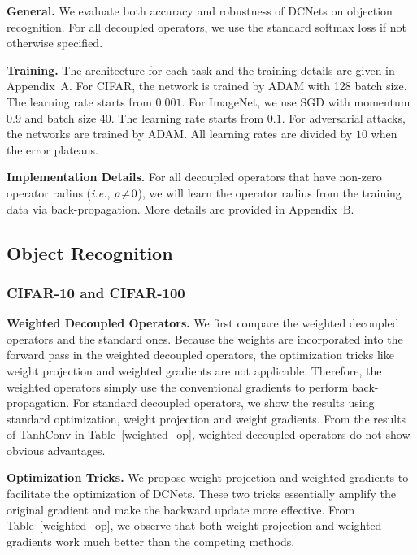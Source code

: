 \textbf{General.} We evaluate both accuracy and robustness of DCNets on objection recognition. For all decoupled operators, we use the standard softmax loss if not otherwise specified.
\par
\textbf{Training.} The architecture for each task and the training details are given in Appendix~\textcolor[rgb]{0.7551,0.2333,0.3333}{A}. For CIFAR, the network is trained by ADAM with 128 batch size. The learning rate starts from $0.001$. For ImageNet, we use SGD with momentum $0.9$ and batch size $40$. The learning rate starts from $0.1$. For adversarial attacks, the networks are trained by ADAM. All learning rates are divided by $10$ when the error plateaus.
\par
\textbf{Implementation Details.} For all decoupled operators that have non-zero operator radius (\emph{i.e.}, $\thickmuskip=2mu \medmuskip=2mu \rho\neq 0$), we will learn the operator radius from the training data via back-propagation. More details are provided in Appendix~\textcolor[rgb]{0.7551,0.2333,0.3333}{B}.

\subsection{Object Recognition}

\subsubsection{CIFAR-10 and CIFAR-100}

\textbf{Weighted Decoupled Operators.} We first compare the weighted decoupled operators and the standard ones. Because the weights are incorporated into the forward pass in the weighted decoupled operators, the optimization tricks like weight projection and weighted gradients are not applicable. Therefore, the weighted operators simply use the conventional gradients to perform back-propagation. For standard decoupled operators, we show the results using standard optimization, weight projection and weight gradients. From the results of TanhConv in Table~\ref{weighted_op}, weighted decoupled operators do not show obvious advantages.

\par

\textbf{Optimization Tricks.} We propose weight projection and weighted  gradients to facilitate the optimization of DCNets. These two tricks essentially amplify the original gradient and make the backward update more effective. From Table~\ref{weighted_op}, we observe that both weight projection and weighted gradients work much better than the competing methods.

